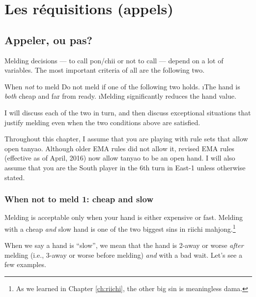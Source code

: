 
\chapter{Les réquisitions (appels)} \label{ch:call}
\thispagestyle{empty}

\section{Appeler, ou pas?}

Melding decisions --- to call {\jap pon}/{\jap chii} or not to call --- depend on a lot of variables. The most important criteria of all are the following two. 

\bigskip
\begin{itembox}[c]{When \emph{not} to meld}
Do not meld if one of the following two holds.
\be
\i The hand is \emph{both} cheap and far from ready.
\i Melding significantly reduces the hand value.
\ee
\end{itembox}

\bigskip
I will discuss each of the two in turn, and then discuss exceptional situations that justify melding even when the two conditions above are satisfied. 

\bigskip
Throughout this chapter, I assume that you are playing with rule sets that allow open {\jap tanyao}. Although older EMA rules did not allow it, revised EMA rules (effective as of April, 2016) now allow {\jap tanyao} to be an open hand. 
I will also assume that you are the South player in the 6th turn in East-1 unless otherwise stated. 

\subsection{When not to meld 1: cheap and slow}
Melding is acceptable only when your hand is either expensive or fast. 
Melding with a cheap \emph{and} slow hand is one of the two biggest sins in riichi mahjong.\footnote{As we learned in Chapter \ref{ch:riichi}, the other big sin is meaningless {\jap dama}.} 

\bigskip
When we say a hand is ``slow'', we mean that the hand is 2-away or worse \emph{after} melding (i.e., 3-away or worse before melding) \emph{and} with a bad wait. Let's see a few examples. 

